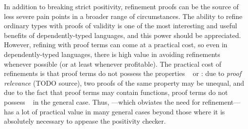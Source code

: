 In addition to breaking strict positivity, refinement proofs can be the source of less severe pain points in
a broader range of circumstances.
The ability to refine ordinary types with proofs of validity is one of the most interesting and useful benefits of
dependently-typed languages, and this power should be appreciated. However, refining with proof terms can
come at a practical cost, so even in dependently-typed languages, there is high value in avoiding refinements
whenever possible (or at least whenever profitable). The practical cost of refinements is that proof terms
do not possess the properties \SemInj~ or \EqDec: due to \emph{proof relevance} (TODO source), two proofs of
the same property may be unequal, and due to the fact that proof terms may contain functions, proof terms do not
possess \EqDec~ in the general case. Thus, \SemTot---which obviates the need for refinement---has
a lot of practical value in many general cases beyond those where it is absolutely necessary to appease the
positivity checker.
